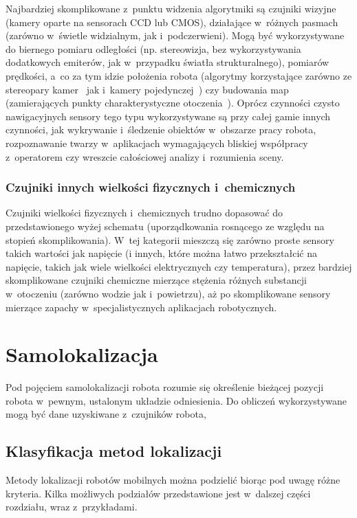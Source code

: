 Najbardziej skomplikowane z~punktu widzenia algorytmiki są czujniki wizyjne
(kamery oparte na sensorach CCD lub CMOS), działające w~różnych pasmach
(zarówno w~świetle widzialnym, jak i~podczerwieni). Mogą być wykorzystywane
do biernego pomiaru odległości (np. stereowizja, bez wykorzystywania dodatkowych
emiterów, jak w~przypadku światła strukturalnego), pomiarów prędkości,
a~co za tym idzie położenia robota (algorytmy korzystające zarówno ze stereopary
kamer~\cite{vodom_stereo} jak i~kamery pojedynczej~\cite{vodom_mono}) czy budowania
map (zamierających punkty charakterystyczne otoczenia~\cite{vslam}). Oprócz
czynności czysto nawigacyjnych sensory tego typu wykorzystywane są przy całej
gamie innych czynności, jak wykrywanie i~śledzenie obiektów w~obszarze pracy robota,
rozpoznawanie twarzy w~aplikacjach wymagających bliskiej współpracy z~operatorem
czy wreszcie całościowej analizy i~rozumienia sceny.

\subsubsection{Czujniki innych wielkości fizycznych i~chemicznych}

Czujniki wielkości fizycznych i~chemicznych trudno dopasować do przedstawionego
wyżej schematu (uporządkowania rosnącego ze względu na stopień skomplikowania).
W~tej kategorii mieszczą się zarówno proste sensory takich wartości jak
napięcie (i innych, które można łatwo przekształcić na napięcie, takich jak
wiele wielkości elektrycznych czy temperatura), przez bardziej skomplikowane
czujniki chemiczne mierzące stężenia różnych substancji w~otoczeniu (zarówno
wodzie jak i~powietrzu), aż po skomplikowane sensory mierzące zapachy
w~specjalistycznych aplikacjach robotycznych.

\section{Samolokalizacja}

Pod pojęciem samolokalizacji robota rozumie się określenie bieżącej pozycji
robota w~pewnym, ustalonym układzie odniesienia. Do obliczeń wykorzystywane mogą
być dane uzyskiwane z~czujników robota,

\subsection{Klasyfikacja metod lokalizacji}

Metody lokalizacji robotów mobilnych można podzielić biorąc pod uwagę różne
kryteria. Kilka możliwych podziałów przedstawione jest w~dalszej części
rozdziału, wraz z~przykładami.

